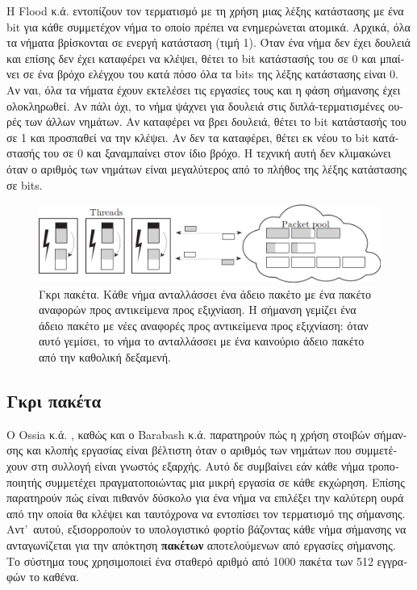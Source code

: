 \begin{greek}
Η Flood κ.ά. \cite{DBLP:conf/jvm/FloodDSZ01} εντοπίζουν τον
τερματισμό με τη χρήση μιας λέξης κατάστασης με ένα bit για
κάθε συμμετέχον νήμα το οποίο πρέπει να ενημερώνεται ατομικά.
Αρχικά, όλα τα νήματα βρίσκονται σε ενεργή κατάσταση (τιμή 1).
Όταν ένα νήμα δεν έχει δουλειά και επίσης δεν έχει καταφέρει
να κλέψει, θέτει το bit κατάστασής του σε 0 και μπαίνει σε
ένα βρόχο ελέγχου του κατά πόσο όλα τα bits της λέξης κατάστασης
είναι 0. Αν ναι, όλα τα νήματα έχουν εκτελέσει τις εργασίες
τους και η φάση σήμανσης έχει ολοκληρωθεί. Αν πάλι όχι, το νήμα
ψάχνει για δουλειά στις διπλά-τερματισμένες ουρές των άλλων
νημάτων. Αν καταφέρει να βρει δουλειά, θέτει το bit κατάστασής
του σε 1 και προσπαθεί να την κλέψει. Αν δεν τα καταφέρει,
θέτει εκ νέου το bit κατάστασής του σε 0 και ξαναμπαίνει στον
ίδιο βρόχο. Η τεχνική αυτή δεν κλιμακώνει όταν ο αριθμός των
νημάτων είναι μεγαλύτερος από το πλήθος της λέξης κατάστασης
σε bits.

\begin{figure}
  \centering
  \includegraphics{figures/par_2}
  \caption[Γκρι πακέτα]
    {Γκρι πακέτα. Κάθε νήμα ανταλλάσσει ένα άδειο πακέτο με
     ένα πακέτο αναφορών προς αντικείμενα προς εξιχνίαση. Η
     σήμανση γεμίζει ένα άδειο πακέτο με νέες αναφορές προς
     αντικείμενα προς εξιχνίαση: όταν αυτό γεμίσει, το νήμα
     το ανταλλάσσει με ένα καινούριο άδειο πακέτο από την
     καθολική δεξαμενή.}
  \label{fig:par_2}
\end{figure}

\subsection{Γκρι πακέτα}
Ο Ossia κ.ά. \cite{DBLP:conf/pldi/OssiaBGKLO02}, καθώς και ο
Barabash κ.ά. \cite{DBLP:journals/toplas/BarabashBGKLOOP05} 
παρατηρούν πώς η χρήση στοιβών
σήμανσης και κλοπής εργασίας είναι βέλτιστη όταν ο αριθμός των
νημάτων που συμμετέχουν στη συλλογή είναι γνωστός εξαρχής. Αυτό
δε συμβαίνει εάν κάθε νήμα τροποποιητής συμμετέχει πραγματοποιώντας
μια μικρή εργασία σε κάθε εκχώρηση. Επίσης παρατηρούν πώς είναι
πιθανόν δύσκολο για ένα νήμα να επιλέξει την καλύτερη ουρά από
την οποία θα κλέψει και ταυτόχρονα να εντοπίσει τον τερματισμό
της σήμανσης. Αντ'~αυτού, εξισορροπούν το υπολογιστικό φορτίο
βάζοντας κάθε νήμα σήμανσης να ανταγωνίζεται για την απόκτηση
\textbf{πακέτων} αποτελούμενων από εργασίες σήμανσης. Το σύστημα
τους χρησιμοποιεί ένα σταθερό αριθμό από 1000 πακέτα των 512
εγγραφών το καθένα.


\end{greek}
